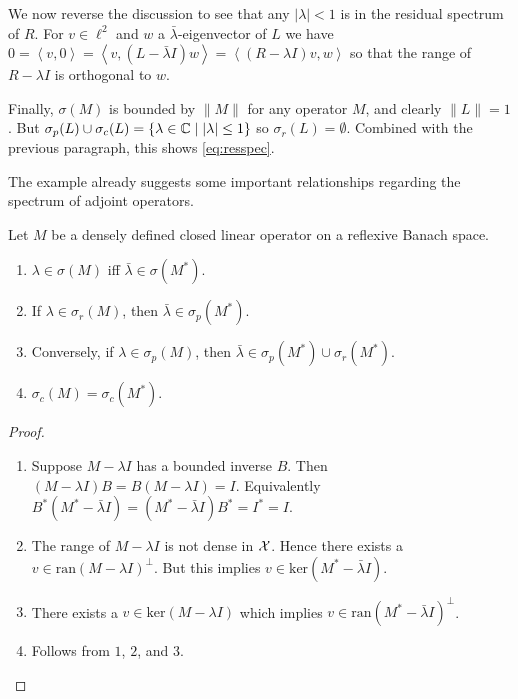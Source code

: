 \begin{example}
    We now reverse the discussion to see that any $| \lambda | < 1$ is in the 
    residual spectrum of $R$. For $v \in \ell^2$ and $w$ a $\bar{\lambda}$-eigenvector of 
    $L$ we have 
    $0 = \left\langle v, 0 \right\rangle 
    = \left\langle v, (L - \bar{\lambda} I) w \right\rangle 
    = \left\langle (R - \lambda I) v, w \right\rangle$ so that the range of 
    $R - \lambda I$ is orthogonal to $w$. 

    Finally, $\sigma (M)$ is bounded by $\| M \|$ for any operator $M$, and clearly 
    $\| L \| = 1$. But $\sigma_p (L) \cup \sigma_c (L) = 
    \left\{ \lambda \in \mathbb{C} \mid | \lambda | \leq 1 \right\}$ so 
    $\sigma_r (L) = \emptyset$. Combined with the previous paragraph, this shows 
    \ref{eq:resspec}. 

\end{example}

The example already suggests some important relationships regarding the spectrum of 
adjoint operators. 

\begin{theorem}
    \label{thm:spec_relations_adjoints}
    Let $M$ be a densely defined closed linear operator on a reflexive Banach space. 
    
    \begin{enumerate}
        \item $\lambda \in \sigma (M)$ iff $\bar{\lambda} \in \sigma (M^*)$. 
        \item If $\lambda \in \sigma_r (M)$, then $\bar{\lambda} \in \sigma_p (M^*)$. 
        \item Conversely, if $\lambda \in \sigma_p (M)$, then 
              $\bar{\lambda} \in \sigma_p (M^*) \cup \sigma_r (M^*)$. 
        \item $\sigma_c (M) = \sigma_c (M^*)$. 
    \end{enumerate}
\end{theorem}

\begin{proof}
    \begin{enumerate}
        \item Suppose $M - \lambda I$ has a bounded inverse $B$. Then 
              $(M - \lambda I) B = B (M - \lambda I) = I$. Equivalently 
              $B^* (M^* - \bar{\lambda} I) = (M^* - \bar{\lambda} I) B^* = I^* = I$. 
        \item The range of $M - \lambda I$ is not dense in $\mathcal{X}$. Hence there exists a 
              $v \in \text{ran} (M - \lambda I)^\perp$. But this implies 
              $v \in \text{ker} (M^* - \bar{\lambda} I)$. 
        \item There exists a $v \in \text{ker} (M - \lambda I)$ which implies 
              $v \in \text{ran} (M^* - \bar{\lambda} I)^\perp$. 
        \item Follows from $1$, $2$, and $3$. 
    \end{enumerate}
\end{proof}


